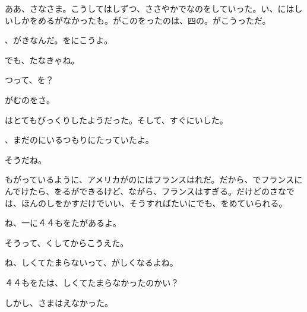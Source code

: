 ああ、さなさま。こうしてはしずつ、ささやかでなのをしていった。い、にはしいしかをめるがなかったも。がこのをったのは、四の。がこうっただ。

、がきなんだ。をにこうよ。

でも、たなきゃね。

つって、を？

がむのをさ。

はとてもびっくりしたようだった。そして、すぐにいした。

、まだのにいるつもりにたっていたよ。

そうだね。

もがっているように、アメリカがのにはフランスはれだ。だから、でフランスにんでけたら、をるができるけど、ながら、フランスはすぎる。だけどのさなでは、ほんのしをかすだけでいい、そうすればたいにでも、をめていられる。

ね、一に４４もをたがあるよ。

そうって、くしてからこうえた。

ね、しくてたまらないって、がしくなるよね。

４４もをたは、しくてたまらなかったのかい？

しかし、さまはえなかった。


